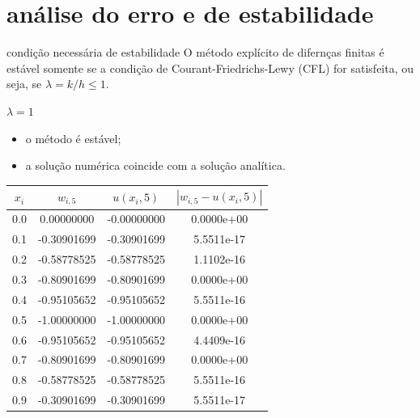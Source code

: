 \documentclass{beamer}
\begin{document}
\section{análise do erro e de estabilidade}

\begin{frame}{condição necessária de estabilidade}
    O método explícito de difernças finitas é estável somente se a \alert{condição de Courant-Friedrichs-Lewy (CFL)} for satisfeita, ou seja, se \(\lambda = k/h \leq 1\)\cite[489]{IK}.
\end{frame}

\begin{frame}{\(\lambda = 1\)}
    \begin{itemize}
        \item o método é estável;
        \item a solução numérica coincide com a solução analítica.
    \end{itemize}
    \begin{table}[H]
        \centering
        \label{tab:resultados_lambda_1}
        \begin{tabular}{cccc}
            \toprule
            \(x_i\) & \(w_{i, 5}\) & \(u(x_i, 5)\) & \(|w_{i, 5} - u(x_i, 5)|\) \\
            \midrule
            0.0 & 0.00000000 & -0.00000000 & 0.0000e+00 \\
            0.1 & -0.30901699 & -0.30901699 & 5.5511e-17 \\
            0.2 & -0.58778525 & -0.58778525 & 1.1102e-16 \\
            0.3 & -0.80901699 & -0.80901699 & 0.0000e+00 \\
            0.4 & -0.95105652 & -0.95105652 & 5.5511e-16 \\
            0.5 & -1.00000000 & -1.00000000 & 0.0000e+00 \\
            0.6 & -0.95105652 & -0.95105652 & 4.4409e-16 \\
            0.7 & -0.80901699 & -0.80901699 & 0.0000e+00 \\
            0.8 & -0.58778525 & -0.58778525 & 5.5511e-16 \\
            0.9 & -0.30901699 & -0.30901699 & 5.5511e-17 \\
            \bottomrule
        \end{tabular}
    \end{table}
\end{frame}
\end{document}
